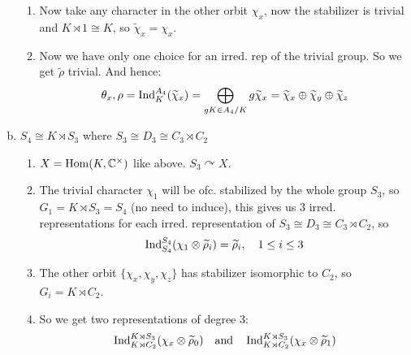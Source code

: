 \documentclass[a4paper]{article}
\begin{document}
\begin{exmp}
\begin{enumerate}[(a)]
\begin{enumerate}[1.]
          \item Now take any character in the other orbit $\chi_{x}$, now the stabilizer is trivial and $K \rtimes 1 \cong K$, so $\tilde \chi_{x} = \chi_{x}$.
            \item Now we have only one choice for an irred. rep of the trivial group. So we get $\tilde \rho$ trivial. And hence:
                  \[\theta_{x},\rho = \operatorname{Ind}_{K}^{A_{4}}(\widetilde \chi_{x}) = \bigoplus_{gK \in A_{4}/K} g\widetilde \chi_{x} = \widetilde\chi_{x} \oplus \widetilde \chi_{y} \oplus \widetilde \chi_{z}\]

          \end{enumerate}
    \item $S_{4} \cong K \rtimes S_{3}$ where $S_{3} \cong D_{3} \cong C_{3} \rtimes C_{2}$
          \begin{enumerate}[1.]
            \item $X = \operatorname{Hom}(K,\mathbb C^\times)$ like above. $S_{3} \curvearrowright X$.
            \item The trivial character $\chi_{1}$ will be ofc. stabilized by the whole group $S_{3}$, so $G_{1} = K \rtimes S_{3} = S_{4}$ (no need to induce), this gives us 3 irred. representations for each irred. representation of $S_{3} \cong D_{3} \cong C_{3} \rtimes C_{2}$, so \[\operatorname{Ind}_{S_{4}}^{S_{4}}(\chi_{1} \otimes \widetilde \rho_{i}) = \widetilde \rho_{i}, \quad 1 \le i \le 3\]
            \item The other orbit $\{\chi_{x}, \chi_{y}, \chi_{z}\}$ has stabilizer isomorphic to $C_{2}$, so $G_{i} = K \rtimes C_{2}$.
            \item So we get two representations of degree 3: \[\operatorname{Ind}_{K \rtimes C_{2}}^{K \rtimes S_{3}}(\chi_{x} \otimes \widetilde \rho_{0})\quad \text{and}\quad \operatorname{Ind}_{K \rtimes C_{2}}^{K \rtimes S_{3}}(\chi_{x} \otimes \widetilde \rho_{1})\]
          \end{enumerate}

  \end{enumerate}

\end{exmp}
\end{document}
